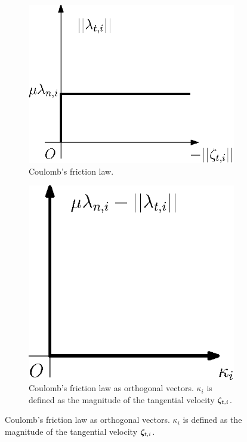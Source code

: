 \documentclass[DC2017114Bouma.tex]{subfiles}
\begin{document}
\begin{figure}[h]
\centering
\begin{subfigure}{0.3\textwidth}
\centering
\includegraphics[width=\linewidth]{coulombfriction.eps}\caption{Coulomb's friction law.}\label{fig:coulombfriction}
\end{subfigure}
\qquad
\begin{subfigure}{0.3\textwidth}
\centering
\includegraphics[width=\linewidth]{coulombort.eps}\caption{Coulomb's friction law as orthogonal vectors. $\kappa_i$ is defined as the magnitude of the tangential velocity $\boldsymbol{\zeta}_{t,i}$.}\label{fig:coulombort}
\end{subfigure}
\end{figure}
\end{document}

